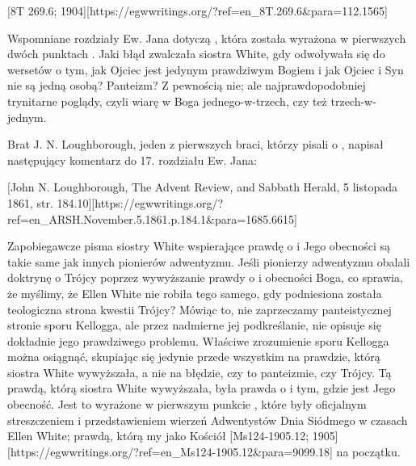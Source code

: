 
[8T 269.6; 1904][https://egwwritings.org/?ref=en\_8T.269.6&para=112.1565]

Wspomniane rozdziały Ew. Jana dotyczą , która została wyrażona w pierwszych dwóch punktach . Jaki błąd zwalczała siostra White, gdy odwoływała się do wersetów o tym, jak Ojciec jest jedynym prawdziwym Bogiem i jak Ojciec i Syn nie są jedną osobą? Panteizm? Z pewnością nie; ale najprawdopodobniej trynitarne poglądy, czyli wiarę w Boga jednego-w-trzech, czy też trzech-w-jednym.

Brat J. N. Loughborough, jeden z pierwszych braci, którzy pisali o , napisał następujący komentarz do 17. rozdziału Ew. Jana:

[John N. Loughborough, The Advent Review, and Sabbath Herald, 5 listopada 1861, str. 184.10][https://egwwritings.org/?ref=en\_ARSH.November.5.1861.p.184.1&para=1685.6615]

Zapobiegawcze pisma siostry White wspierające prawdę o  i Jego obecności są takie same jak innych pionierów adwentyzmu. Jeśli pionierzy adwentyzmu obalali doktrynę o Trójcy poprzez wywyższanie prawdy o  i obecności Boga, co sprawia, że myślimy, że Ellen White nie robiła tego samego, gdy podniesiona została teologiczna strona kwestii Trójcy? Mówiąc to, nie zaprzeczamy panteistycznej stronie sporu Kellogga, ale przez nadmierne jej podkreślanie, nie opisuje się dokładnie jego prawdziwego problemu. Właściwe zrozumienie sporu Kellogga można osiągnąć, skupiając się jedynie przede wszystkim na prawdzie, którą siostra White wywyższała, a nie na błędzie, czy to panteizmie, czy Trójcy. Tą prawdą, którą siostra White wywyższała, była prawda o  i tym, gdzie jest Jego obecność. Jest to wyrażone w pierwszym punkcie , które były oficjalnym streszczeniem i przedstawieniem wierzeń Adwentystów Dnia Siódmego w czasach Ellen White; prawdą, którą my jako Kościół [Ms124-1905.12; 1905][https://egwwritings.org/?ref=en\_Ms124-1905.12&para=9099.18] na początku.

